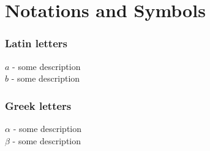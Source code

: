 \chapter*{Notations and Symbols}

\subsection*{Latin letters}

$a$ - some description\\
$b$ - some description

\subsection*{Greek letters}

$\alpha$ - some description\\
$\beta$ - some description
